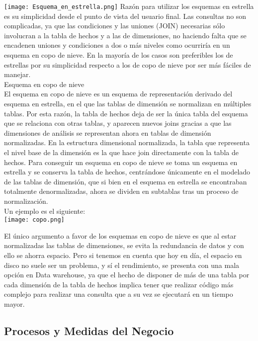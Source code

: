 \documentclass[DIV=calc, paper=a4, fontsize=11pt, twocolumn]{scrartcl}	 %
\begin{document}
\texttt{[image: Esquema\_en\_estrella.png]}
Raz\'{o}n para utilizar los esquemas en estrella es su simplicidad desde el punto de vista del usuario final. Las consultas no son 
complicadas, ya que las condiciones y las uniones (JOIN) necesarias s\'{o}lo involucran a la tabla de hechos y a las de dimensiones, 
no haciendo falta que se encadenen uniones y condiciones a dos o m\'{a}s niveles como ocurrir\'{i}a en un esquema en copo de nieve. En 
la mayor\'{i}a de los casos son preferibles los de estrellas por su simplicidad respecto a los de copo de nieve por ser m\'{a}s f\'{a}ciles de manejar.\\
Esquema en copo de nieve\\
El esquema en copo de nieve es un esquema de representaci\'{o}n derivado del esquema en estrella, en el que las tablas de 
dimensi\'{o}n se normalizan en m\'{u}ltiples tablas. Por esta raz\'{o}n, la tabla de hechos deja de ser la \'{u}nica tabla del esquema 
que se relaciona con otras tablas, y aparecen nuevos joins gracias a que las dimensiones de an\'{a}lisis se representan 
ahora en tablas de dimensi\'{o}n normalizadas. En la estructura dimensional normalizada, la tabla que representa el nivel 
base de la dimensi\'{o}n es la que hace join directamente con la tabla de hechos. Para conseguir un esquema en copo de nieve se toma un 
esquema en estrella y se conserva la tabla de hechos, centr\'{a}ndose \'{u}nicamente en el modelado de las tablas de dimensi\'{o}n, 
que si bien en el esquema en estrella se encontraban totalmente denormalizadas, ahora se dividen en subtablas tras un 
proceso de normalizaci\'{o}n. \\
Un ejemplo es el siguiente:\\
\texttt{[image: copo.png]}

El \'{u}nico argumento a favor de los esquemas en copo de nieve es que al estar normalizadas las tablas de dimensiones, 
se evita la redundancia de datos y con ello se ahorra espacio. Pero si tenemos en cuenta que hoy en d\'{i}a, el espacio en 
disco no suele ser un problema, y s\'{i} el rendimiento, se presenta con una mala opci\'{o}n en Data warehouse, ya que el hecho de 
disponer de m\'{a}s de una tabla por cada dimensi\'{o}n de la tabla de hechos implica tener que realizar c\'{o}digo m\'{a}s complejo para 
realizar una consulta que a su vez se ejecutar\'{a} en un tiempo mayor.


\subsection*{Procesos y Medidas del Negocio}
\end{document}
